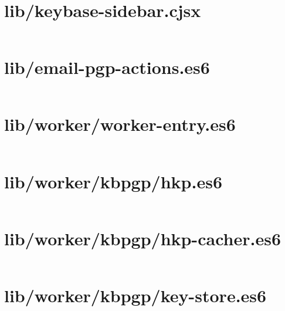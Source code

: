 \documentclass[10pt, letterpaper]{article}
\begin{document}

\section{lib/keybase-sidebar.cjsx}
\inputminted{coffee}{/home/mbilker/.nylas/dev/packages/email-pgp/lib/keybase-sidebar.cjsx}

\section{lib/email-pgp-actions.es6}
\inputminted{javascript}{/home/mbilker/.nylas/dev/packages/email-pgp/lib/email-pgp-actions.es6}

\section{lib/worker/worker-entry.es6}
\inputminted{javascript}{/home/mbilker/.nylas/dev/packages/email-pgp/lib/worker/worker-entry.js}


\section{lib/worker/kbpgp/hkp.es6}
\inputminted{javascript}{/home/mbilker/.nylas/dev/packages/email-pgp/lib/worker/kbpgp/hkp.es6}

\section{lib/worker/kbpgp/hkp-cacher.es6}
\inputminted{javascript}{/home/mbilker/.nylas/dev/packages/email-pgp/lib/worker/kbpgp/hkp-cacher.es6}

\section{lib/worker/kbpgp/key-store.es6}
\inputminted{javascript}{/home/mbilker/.nylas/dev/packages/email-pgp/lib/worker/kbpgp/key-store.es6}
\end{document}
